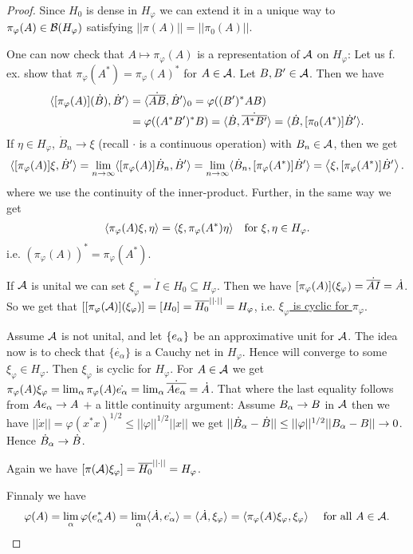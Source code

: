 \documentclass[10pt,english,a4paper]{article}
\theoremstyle{definition}
\def\dA{\dot{A}}
\def\dB{\dot{B}}
\def\eal{e_{\alpha}}
\def\dA{\dot{A}}
\def\dB{\dot{B}}
\def\vphi{\varphi}
\begin{document}
\begin{proof}
Since $H_0$
is dense in $H_{\vphi}$ we can extend it in a unique way to $\pi_{\vphi}(A) \in \Bs(H_{\vphi})$
satisfying $||\pi(A)|| = ||\pi_0(A)||$.

One can now check that $A \mapsto \pi_{\vphi} (A)$ is a representation of $\mathcal{A}$
on $H_{\vphi}$:
Let us f. ex. show that $\pi_{\vphi}(A^*) = \pi_{\vphi}(A)^*$ for $A \in \mathcal{A}$.
Let $B,B' \in \mathcal{A}$. Then we have 
\begin{align*}
    \indi{[\pi_{\vphi}(A)](\dB), \dB'} &= \indi{\dot{\ol{AB}},\dB'}_0 =
\vphi((B')^*AB) \\
&= \vphi((A^*B')^*B) = \indi{\dB, \dot{\ol{A^*B'}}} = \indi{\dB, [\pi_0(A^*)]\dB'}.
\end{align*}
If $\eta \in H_{\vphi}$, $\dB_n \to \xi$ (recall $\cdot$ is a continuous operation) with $B_n \in \mathcal{A}$,
then we get 
\begin{align*}
    \indi{[\pi_{\vphi}(A)]\xi,\dB'} = \lim_{n\to\infty} \indi{[\pi_{\vphi}(A)]\dB_n, \dB'}
= \lim_{n\to\infty} \indi{\dB_n, [\pi_{\vphi}(A^*)]\dB'} = \ind{\xi,[\pi_{\vphi}(A^*)]\dB'}.
\end{align*}
where we use the continuity of the inner-product. Further, in the same way we get
\begin{align*}
    \indi{\pi_{\vphi}(A)\xi,\eta} = \indi{\xi, \pi_{\vphi}(A^*)\eta} \quad \text{for }
\xi,\eta\in H_{\vphi}.
\end{align*}
i.e. \ul{$(\pi_{\vphi}(A))^* = \pi_{\vphi}(A^*)$}.

If $\mathcal{A}$ is unital we can set $\xi_{\vphi} = \dot{I} \in H_0 \subseteq
H_{\vphi}$.  Then we have $[\pi_{\vphi}(A)](\xi_{\vphi}) = \dot{\ol{AI}} =
\dA$.  So we get that $\left[[\pi_{\vphi}(\As)](\xi_{\vphi})\right]  = [H_0] =
\ol{H_0}^{||\cdot||} = H_{\vphi}$, i.e. \ul{$\xi_{\vphi}$ is cyclic for
$\pi_{\vphi}$}.

Assume $\mathcal{A}$ is not unital, and let $\{e_{\alpha}\}$ be an approximative unit for $\mathcal{A}$.
The idea now is to check that $\{\dot{\eal}\}$ is a Cauchy net in $H_{\vphi}$.
Hence will converge to some $\xi_{\vphi} \in H_{\vphi}$. Then $\xi_{\vphi}$ is cyclic 
for $H_{\vphi}$.
For $A \in \mathcal{A}$ we get $\pi_{\vphi}(A)\xi_{\vphi} = \lim_{\al} \pi_{\vphi}(A)\dot{\eal} = 
\lim_{\al} \dot{\ol{Ae_{\al}}} = \dA$.
That where the last equality follows from $Ae_{\alpha}\to A$ $+$ a little
continuity argument: Assume $B_{\alpha}\to B$ in $\mathcal{A}$ then we have 
$||\dot{x}|| = \vphi(x^*x)^{1/2} \leq ||\vphi||^{1/2}||x||$ we get 
$||\dB_{\al} - \dB|| \leq ||\vphi||^{1/2} ||B_{\al} - B|| \to 0$. Hence 
$\dB_{\al}\to \dB$.

Again we have $[\pi(\As)\xi_{\vphi}] = \ol{H_0}^{||\cdot||} = H_{\vphi}$.

Finnaly we have
\begin{align*}
    \vphi(A) =\lim_{\al} \vphi(e^{*}_{\al}A) = \lim_{\al} \indi{\dA,\dot{\eal}} = \indi{\dA, \xi_{\vphi}}
= \indi{\pi_{\vphi}(A)\xi_{\vphi},\xi_{\vphi}} \quad\text{ for all }A \in \As.
\end{align*}

\end{proof}
\end{document}
